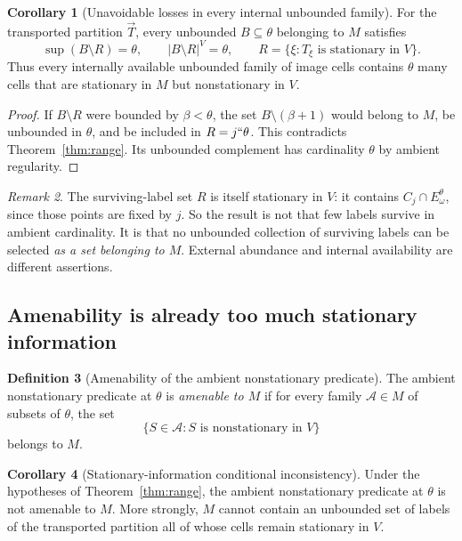 \documentclass[11pt,letterpaper]{article}
\theoremstyle{definition}
\newtheorem{definition}{Definition}[section]
\newtheorem{corollary}[definition]{Corollary}
\theoremstyle{remark}
\newtheorem{remark}[definition]{Remark}
\begin{document}
\begin{corollary}[Unavoidable losses in every internal unbounded family]\label{cor:losses}
For the transported partition $\vec T$, every unbounded $B\subseteq\theta$ belonging to $M$ satisfies
\[
 \sup(B\setminus R)=\theta,
 \qquad |B\setminus R|^V=\theta,
 \qquad R=\{\xi:T_\xi\text{ is stationary in }V\}.
\]
Thus every internally available unbounded family of image cells contains $\theta$ many cells that are stationary in $M$ but nonstationary in $V$.
\end{corollary}

\begin{proof}
If $B\setminus R$ were bounded by $\beta<\theta$, the set $B\setminus(\beta+1)$ would belong to $M$, be unbounded in $\theta$, and be included in $R=j``\theta$. This contradicts Theorem~\ref{thm:range}. Its unbounded complement has cardinality $\theta$ by ambient regularity.
\end{proof}

\begin{remark}
The surviving-label set $R$ is itself stationary in $V$: it contains $C_j\cap E^\theta_\omega$, since those points are fixed by $j$. So the result is not that few labels survive in ambient cardinality. It is that no unbounded collection of surviving labels can be selected \emph{as a set belonging to $M$}. External abundance and internal availability are different assertions.
\end{remark}

\subsection{Amenability is already too much stationary information}

\begin{definition}[Amenability of the ambient nonstationary predicate]
The ambient nonstationary predicate at $\theta$ is \emph{amenable to $M$} if for every family $\mathcal A\in M$ of subsets of $\theta$, the set
\[
 \{S\in\mathcal A:S\text{ is nonstationary in }V\}
\]
belongs to $M$.
\end{definition}

\begin{corollary}[Stationary-information conditional inconsistency]\label{cor:amenable}
Under the hypotheses of Theorem~\ref{thm:range}, the ambient nonstationary predicate at $\theta$ is not amenable to $M$. More strongly, $M$ cannot contain an unbounded set of labels of the transported partition all of whose cells remain stationary in $V$.
\end{corollary}
\end{document}
